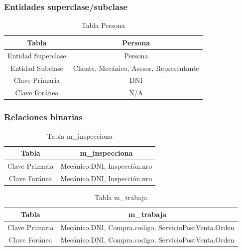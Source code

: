 \documentclass[12pt]{article}
\begin{document}
\newpage

\subsubsection{Entidades superclase/subclase}

\begin{table}[htbp]
\begin{center}
\begin{tabular}{|c|c|}
\hline
Tabla & Persona \\
\hline
Entidad Superclase & Persona \\
\hline
Entidad Subclase & Cliente, Mecánico, Asesor, Representante \\
\hline
Clave Primaria & DNI \\
\hline
Clave Foránea & N/A \\
\hline
\end{tabular}        
\caption{Tabla Persona}
\end{center}
\end{table}

\newpage

\subsubsection{Relaciones binarias}

\begin{table}[htbp]
\begin{center}
\begin{tabular}{|c|c|}
\hline
Tabla & m\_inspecciona \\
\hline
Clave Primaria & Mecánico.DNI, Inspección.nro \\
\hline
Clave Foránea & Mecánico.DNI, Inspección.nro \\
\hline
\end{tabular}
\caption{Tabla m\_inspecciona}
\end{center}
\end{table}

\begin{table}[htbp]
\begin{center}
\begin{tabular}{|c|c|}
\hline
Tabla & m\_trabaja \\
\hline
Clave Primaria & Mecánico.DNI, Compra.codigo, ServicioPostVenta.Orden \\
\hline
Clave Foránea & Mecánico.DNI, Compra.codigo, ServicioPostVenta.Orden \\
\hline
\end{tabular}
\caption{Tabla m\_trabaja}
\end{center}
\end{table}
\end{document}
